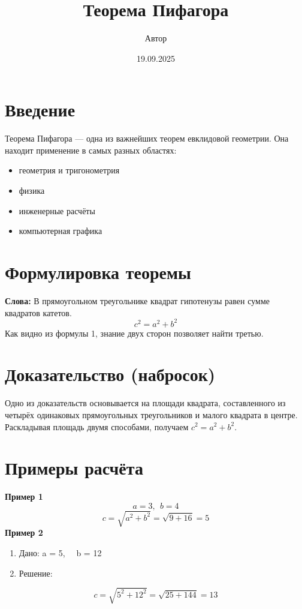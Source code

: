 \documentclass{article}
\title{Теорема Пифагора}
\author{Автор}
\date{19.09.2025}
\begin{document}
\maketitle
\tableofcontents
\newpage



\section{Введение}
Теорема Пифагора — одна из важнейших теорем евклидовой геометрии. Она находит применение в самых разных областях:
\begin{itemize}
    \item геометрия и тригонометрия
    \item физика
    \item инженерные расчёты
    \item компьютерная графика
\end{itemize}



\section{Формулировка теоремы}
\textbf{Слова:} В прямоугольном треугольнике квадрат гипотенузы равен сумме квадратов катетов.
\begin{equation}
    c^2 = a^2 + b^2
\end{equation}
Как видно из формулы 1, знание двух сторон позволяет найти третью.



\section{Доказательство (набросок)}
\begin{flushleft}
Одно из доказательств основывается на площади квадрата, составленного
из четырёх одинаковых прямоугольных треугольников и малого квадрата
в центре. Раскладывая площадь двумя способами, получаем $c^2 = a^2 + b^2$.
\end{flushleft}



\section{Примеры расчёта}
\textbf{Пример 1}
\[
a = 3, \ \ b = 4
\]
\[
c = \sqrt{a^2+b^2}=\sqrt{9+16}=5
\]
\textbf{Пример 2}
\begin{enumerate}
    \item Дано: a = 5, \ \ b = 12
    \item Решение:
\end{enumerate}
\[
c = \sqrt{5^2+12^2}=\sqrt{25+144}=13
\]
\end{document}
